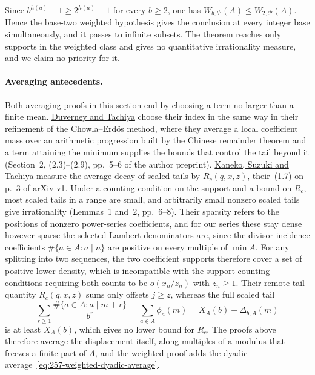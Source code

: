 Since $b^{h(a)}-1\ge2^{h(a)}-1$ for every $b\ge2$, one has
$W_{b,\mathcal P}(A)\le W_{2,\mathcal P}(A)$. Hence the base-two weighted
hypothesis gives the conclusion at every integer base simultaneously, and
it passes to infinite subsets. The theorem reaches only supports in the
weighted class and gives no quantitative irrationality measure, and we
claim no priority for it.

\paragraph{Averaging antecedents.}
Both averaging proofs in this section end by choosing a term no larger than a
finite mean.
\href{https://danielduverney.fr/documents/theorie-des-nombres/DuverneyTachiya190522.pdf}{Duverney
and Tachiya} choose their index in the same way in their refinement of the
Chowla--Erd\H{o}s method, where they average a local coefficient mass over
an arithmetic progression built by the Chinese remainder theorem and a term
attaining the minimum supplies the bounds that control the tail beyond it
(Section~2, (2.3)--(2.9), pp.~5--6 of the author preprint).
\href{https://arxiv.org/abs/2601.20743}{Kaneko, Suzuki and Tachiya} measure
the average decay of scaled tails by $R_c(q,x,z)$, their~(1.7) on p.~3 of
arXiv v1.  Under a counting condition on the support and a bound on $R_c$,
most scaled tails in a range are small, and arbitrarily small nonzero scaled
tails give irrationality (Lemmas~1 and~2, pp.~6--8).
Their sparsity refers to the positions of nonzero power-series
coefficients, and for our series these stay dense however sparse the
selected Lambert denominators are, since the divisor-incidence
coefficients $\#\{a\in A:a\mid n\}$ are positive on every multiple of
$\min A$. For any splitting into two sequences, the two coefficient
supports therefore cover a set of positive lower density, which is
incompatible with the support-counting conditions
\cite[Theorem~1(iii), p.~3, and Theorem~3(iv), p.~5]{kanekosuzukitachiya}
requiring both counts to be $o(x_n/z_n)$ with $z_n\ge1$.  Their remote-tail
quantity $R_c(q,x,z)$ sums only offsets $j\ge z$, whereas the full scaled tail
\[
 \sum_{r\ge1}\frac{\#\{a\in A:a\mid m+r\}}{b^r}
 =\sum_{a\in A}\phi_a(m)=X_A(b)+\Delta_{b,A}(m)
\]
is at least $X_A(b)$, which gives no lower bound for $R_c$. The proofs
above therefore average the displacement itself, along multiples of a
modulus that freezes a finite part of $A$, and the weighted proof adds the
dyadic average~\eqref{eq:257-weighted-dyadic-average}.

